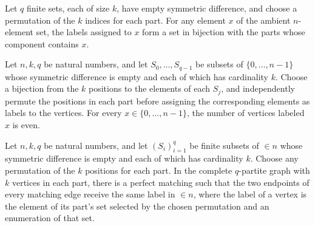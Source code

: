 \begin{definition}
\label{FABL.LevelKParityTuple.assignedLabelFiberEquivPartFiber}
\leanok
{}
Let $q$ finite sets, each of size $k$, have empty symmetric difference, and choose a
permutation of the $k$ indices for each part. For any element $x$ of the ambient
$n$-element set, the labels assigned to $x$ form a set in bijection with the parts whose
component contains $x$.
\end{definition}

\begin{theorem}
\label{FABL.LevelKParityTuple.assignedVertexLabel_even_fiber}
\leanok
{}
Let $n,k,q$ be natural numbers, and let $S_0,\ldots,S_{q-1}$ be subsets of
$\{0,\ldots,n-1\}$ whose symmetric difference is empty and each of which has cardinality
$k$. Choose a bijection from the $k$ positions to the elements of each $S_j$, and
independently permute the positions in each part before assigning the corresponding
elements as labels to the vertices. For every $x\in\{0,\ldots,n-1\}$, the number of
vertices labeled $x$ is even.
\end{theorem}

\begin{theorem}
\label{FABL.LevelKParityTuple.exists_compatible_matching}
\leanok
{}
Let $n,k,q$ be natural numbers, and let $(S_i)_{i=1}^q$ be finite subsets of $\in n$
whose symmetric difference is empty and each of which has cardinality $k$. Choose any
permutation of the $k$ positions for each part. In the complete $q$-partite graph with
$k$ vertices in each part, there is a perfect matching such that the two endpoints of
every matching edge receive the same label in $\in n$, where the label of a vertex is
the element of its part’s set selected by the chosen permutation and an enumeration of
that set.
\end{theorem}

